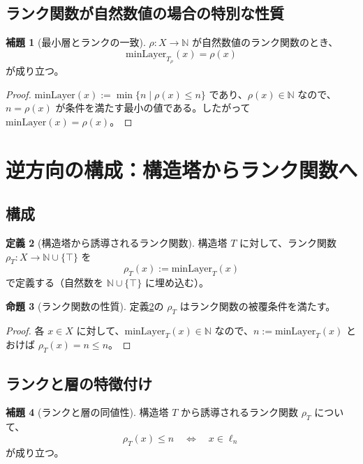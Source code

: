 \documentclass[a4paper,11pt]{ltjsarticle}
\theoremstyle{definition}
\newtheorem{definition}{定義}[section]
\newtheorem{lemma}[definition]{補題}
\newtheorem{proposition}[definition]{命題}
\begin{document}
\subsection{ランク関数が自然数値の場合の特別な性質}

\begin{lemma}[最小層とランクの一致]\label{lem:minlayer_eq_rank}
$\rho : X \to \mathbb{N}$ が自然数値のランク関数のとき、
\[
\mathrm{minLayer}_{T_\rho}(x) = \rho(x)
\]
が成り立つ。
\end{lemma}

\begin{proof}
$\mathrm{minLayer}(x) := \min\{n \mid \rho(x) \leq n\}$ であり、$\rho(x) \in \mathbb{N}$ なので、$n = \rho(x)$ が条件を満たす最小の値である。したがって $\mathrm{minLayer}(x) = \rho(x)$。
\end{proof}

\section{逆方向の構成：構造塔からランク関数へ}

\subsection{構成}

\begin{definition}[構造塔から誘導されるランク関数]\label{def:tower_to_rank}
構造塔 $T$ に対して、ランク関数 $\rho_T : X \to \mathbb{N} \cup \{\top\}$ を
\[
\rho_T(x) := \mathrm{minLayer}_T(x)
\]
で定義する（自然数を $\mathbb{N} \cup \{\top\}$ に埋め込む）。
\end{definition}

\begin{proposition}[ランク関数の性質]\label{prop:tower_gives_rank}
定義\ref{def:tower_to_rank}の $\rho_T$ はランク関数の被覆条件を満たす。
\end{proposition}

\begin{proof}
各 $x \in X$ に対して、$\mathrm{minLayer}_T(x) \in \mathbb{N}$ なので、$n := \mathrm{minLayer}_T(x)$ とおけば $\rho_T(x) = n \leq n$。
\end{proof}

\subsection{ランクと層の特徴付け}

\begin{lemma}[ランクと層の同値性]\label{lem:rank_layer_equiv}
構造塔 $T$ から誘導されるランク関数 $\rho_T$ について、
\[
\rho_T(x) \leq n \quad\Leftrightarrow\quad x \in \ell_n
\]
が成り立つ。
\end{lemma}
\end{document}
